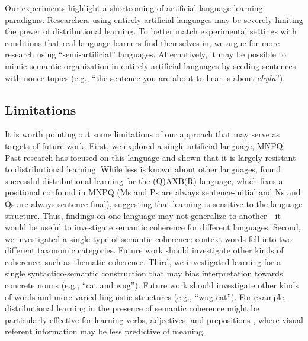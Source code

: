 \documentclass[man,floatsintext]{apa6}
\begin{document}
Our experiments highlight a shortcoming of artificial language learning paradigms. Researchers using entirely artificial languages may be severely limiting the power of distributional learning. To better match experimental settings with conditions that real language learners find themselves in, we argue for more research using ``semi-artificial'' languages. Alternatively, it may be possible to mimic semantic organization in entirely artificial languages by seeding sentences with nonce topics (e.g., ``the sentence you are about to hear is about \emph{chylu}'').

\subsection{Limitations}

It is worth pointing out some limitations of our approach that may serve as targets of future work. First, we explored a single artificial language, MNPQ. Past research has focused on this language and shown that it is largely resistant to distributional learning. While less is known about other languages, \citet{reeder2009} found successful distributional learning for the (Q)AXB(R) language, which fixes a positional confound in MNPQ (Ms and Ps are always sentence-initial and Ns and Qs are always sentence-final), suggesting that learning is sensitive to the language structure. Thus, findings on one language may not generalize to another---it would be useful to investigate semantic coherence for different languages. Second, we investigated a single type of semantic coherence: context words fell into two different taxonomic categories. Future work should investigate other kinds of coherence, such as thematic coherence. Third, we investigated learning for a single syntactico-semantic construction that may bias interpretation towards concrete nouns (e.g., ``cat and wug''). Future work should investigate other kinds of words and more varied linguistic structures (e.g., ``wug cat''). For example, distributional learning in the presence of semantic coherence might be particularly effective for learning verbs, adjectives, and prepositions \citep{redington1998}, where visual referent information may be less predictive of meaning.
\end{document}
